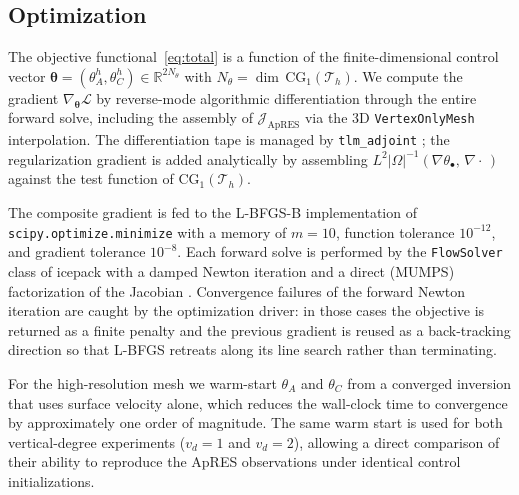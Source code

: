 \subsection{Optimization}
\label{sec:optim}

The objective functional~\eqref{eq:total} is a function of the
finite-dimensional control vector
$\bm\theta = (\theta_A^h, \theta_C^h) \in \mathbb R^{2 N_\theta}$
with $N_\theta = \dim\,\mathrm{CG}_1(\mathcal T_h)$. We compute the
gradient $\nabla_{\!\bm\theta}\mathcal L$ by reverse-mode
algorithmic differentiation through the entire forward solve,
including the assembly of $\mathcal J_\mathrm{ApRES}$ via the
3D \texttt{VertexOnlyMesh} interpolation. The differentiation tape
is managed by \texttt{tlm\_adjoint} \citep{Maddison2019}; the
regularization gradient is added analytically by assembling
$L^2 |\Omega|^{-1} (\nabla\theta_\bullet,\,\nabla\!\cdot\,)$
against the test function of $\mathrm{CG}_1(\mathcal T_h)$.

The composite gradient is fed to the L-BFGS-B implementation of
\texttt{scipy.optimize.minimize} \citep{Virtanen2020} with a memory
of $m=10$, function tolerance $10^{-12}$, and gradient tolerance
$10^{-8}$. Each forward solve is performed by the
\texttt{FlowSolver} class of icepack with a damped Newton iteration
and a direct (MUMPS) factorization of the Jacobian
\citep{Amestoy2001}. Convergence failures of the forward Newton
iteration are caught by the optimization driver: in those cases the
objective is returned as a finite penalty and the previous
gradient is reused as a back-tracking direction so that L-BFGS
retreats along its line search rather than terminating.

For the high-resolution mesh we warm-start $\theta_A$ and
$\theta_C$ from a converged inversion that uses surface velocity
alone, which reduces the wall-clock time to convergence by
approximately one order of magnitude. The same warm start is used
for both vertical-degree experiments ($v_d=1$ and $v_d=2$),
allowing a direct comparison of their ability to reproduce the
ApRES observations under identical control initializations.
